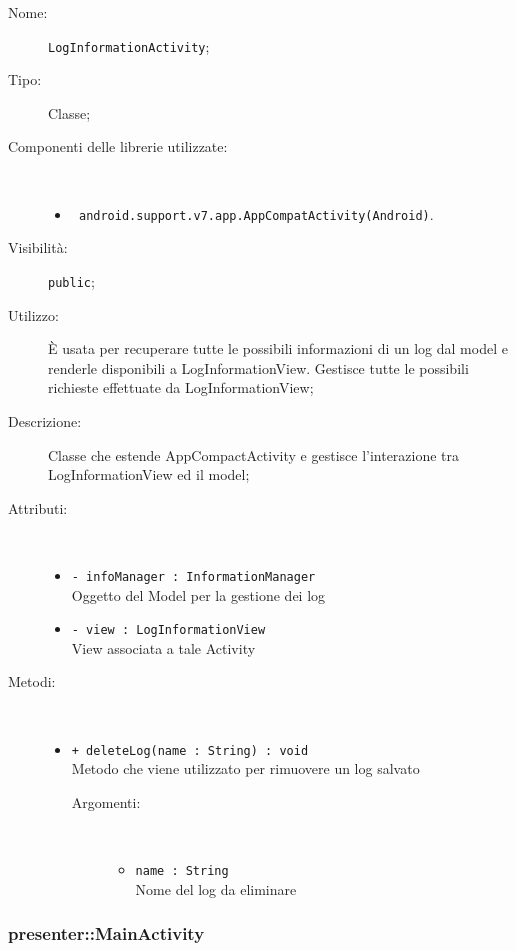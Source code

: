 \documentclass[../DefinizioneDiProdotto.tex]{subfiles}
\begin{document}
    \begin{description}
\item[Nome:] \texttt{LogInformationActivity};
\item[Tipo:] Classe;
\item[Componenti delle librerie utilizzate:] \
\begin{itemize}
\item \texttt{ android.support.v7.app.AppCompatActivity(Android)}.

\end{itemize}
\item[Visibilità:] \texttt{public};
\item[Utilizzo:] È usata per recuperare tutte le possibili informazioni di un log dal model e renderle disponibili a LogInformationView. Gestisce tutte le possibili richieste effettuate da LogInformationView;
\item[Descrizione:] Classe che estende AppCompactActivity e gestisce l'interazione tra LogInformationView ed il model;
\item[Attributi:] \
\begin{itemize}
\item \texttt{- infoManager : InformationManager}\\
Oggetto del Model per la gestione dei log

\item \texttt{- view : LogInformationView}\\
View associata a tale Activity

\end{itemize}
\item[Metodi:] \
\begin{itemize}
\item \texttt{+ deleteLog(name : String) : void}\\
Metodo che viene utilizzato per rimuovere un log salvato
 \begin{description}
\item[Argomenti:] \
\begin{itemize}
\item \texttt{name : String}\\
Nome del log da eliminare\end{itemize}
\end{description}
\end{itemize}
\end{description}

\subsubsection{presenter::MainActivity}
\end{document}
